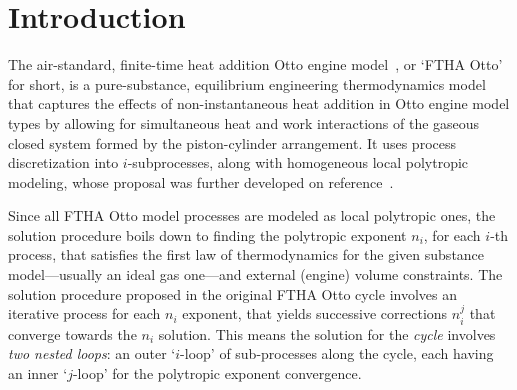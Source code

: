 \section{Introduction}

    The air-standard, finite-time heat addition Otto engine model~\cite{2017-NaaktgeborenC-IntJMechEngEduc}, or `FTHA Otto'  for
    short, is a pure-substance, equilibrium engineering thermodynamics model that captures the effects of non-instantaneous heat
    addition in Otto engine model types by allowing for simultaneous heat and work interactions of  the  gaseous  closed  system
    formed by the piston-cylinder arrangement. It uses process discretization  into  $i$-subprocesses,  along  with  homogeneous
    local        polytropic        modeling,        whose        proposal        was        further         developed         on
    reference~\cite{2020-NaaktgeborenC-Polytropic-engrXiv-rev02}.

    Since all FTHA Otto model processes are modeled as local polytropic ones, the solution procedure boils down to  finding  the
    polytropic exponent $n_i$, for each $i$-th process, that satisfies the first law of thermodynamics for the  given  substance
    model---usually an ideal gas one---and external (engine) volume constraints. The solution procedure proposed in the original
    FTHA Otto cycle involves an iterative process for each $n_i$ exponent,  that  yields  successive  corrections  $n_i^j$  that
    converge towards the $n_i$ solution. This means the solution for the \emph{cycle} involves \emph{two nested loops}: an outer
    `$i$-loop' of sub-processes along the cycle, each having an inner `$j$-loop' for the polytropic exponent convergence.

    


